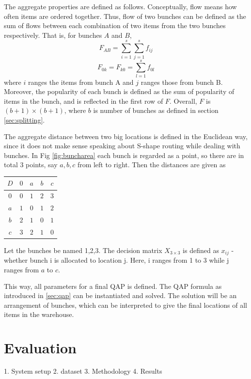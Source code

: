 \documentclass[hyp]{socreport}
\begin{document}
The aggregate properties are defined as follows. Conceptually, flow means how often items are ordered together. Thus, flow of two bunches can be defined as the sum of flows between each combination of two items from the two bunches respectively. That is, for bunches $A$ and $B$, 
\[F_{AB} = \sum_{i=1}^{s}\sum_{j=1}^{s}f_{ij}\]
\[F_{0k} = F_{k0} = \sum_{l=1}^{s}f_{0l}\]
where $i$ ranges the items from bunch A and $j$ ranges those from bunch B. Moreover, the popularity of each bunch is defined as the sum of popularity of items in the bunch, and is reflected in the first row of $F$. Overall, $F$ is $(b+1) \times (b+1)$, where $b$ is number of bunches as defined in section \ref{sec:splitting}. \par
The aggregate distance between two big locations is defined in the Euclidean way, since it does not make sense speaking about S-shape routing while dealing with bunches. In Fig \ref{fig:buncharea} each bunch is regarded as a point, so there are in total 3 points, say $a, b, c$ from left to right. Then the distances are given as\bigskip

\begin{center}
\begin{tabular}{|c|c|c|c|c|}
\hline
$D$ & $0$ & $a$ & $b$ & $c$\\
\hline
$0$ & $0$ & $1$ & $2$ & $3$\\
\hline
$a$ & $1$ & $0$ & $1$ & $2$\\
\hline
$b$ & $2$ & $1$ & $0$ & $1$\\
\hline
$c$ & $3$ & $2$ & $1$ & $0$\\
\hline
\end{tabular}
\end{center}

\bigskip Let the bunches be named 1,2,3. The decision matrix $X_{3\times 3}$ is defined as $x_{ij}$ - whether bunch i is allocated to location j. Here, i ranges from 1 to 3 while j ranges from $a$ to $c$.

This way, all parameters for a final QAP is defined. The QAP formula as introduced in \ref{sec:qap} can be instantiated and solved. The solution will be an arrangement of bunches, which can be interpreted to give the final locations of all items in the warehouse.

\chapter{Evaluation}
1. System setup
2. dataset
3. Methodology
4. Results
\end{document}
